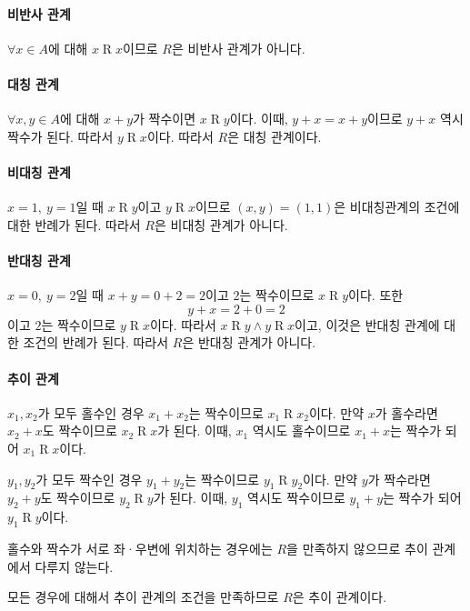 \documentclass{oblivoir}
\begin{document}
\paragraph{비반사 관계}
$\forall x \in A$에 대해 $x \mathrel R x$이므로
$R$은 비반사 관계가 아니다.

\paragraph{대칭 관계}
$\forall x,y \in A$에 대해 $x + y$가 짝수이면 $x \mathrel R y$이다.
이때, $y + x = x + y$이므로 $y + x$ 역시 짝수가 된다.
따라서 $y \mathrel R x$이다.
따라서 $R$은 대칭 관계이다.

\paragraph{비대칭 관계}
$x = 1,\ y = 1$일 때 $x \mathrel R y$이고 $y \mathrel R x$이므로
$(x,y) = (1,1)$은 비대칭관계의 조건에 대한 반례가 된다.
따라서 $R$은 비대칭 관계가 아니다.

\paragraph{반대칭 관계}
$x = 0,\ y = 2$일 때 $x + y = 0 + 2 = 2$이고 $2$는 짝수이므로 $x \mathrel R y$이다.
또한
\begin{equation}
    y + x = 2 + 0 = 2
\end{equation}이고 $2$는 짝수이므로 $y \mathrel R x$이다.
따라서 $x \mathrel R y \wedge y \mathrel R x$이고,
이것은 반대칭 관계에 대한 조건의 반례가 된다.
따라서 $R$은 반대칭 관계가 아니다.

\paragraph{추이 관계}
$x_1,x_2$가 모두 홀수인 경우 $x_1 + x_2$는 짝수이므로 $x_1 \mathrel R x_2$이다.
만약 $x$가 홀수라면 $x_2 + x$도 짝수이므로 $x_2 \mathrel R x$가 된다.
이때, $x_1$ 역시도 홀수이므로 $x_1 + x$는 짝수가 되어 $x_1 \mathrel R x$이다.

$y_1,y_2$가 모두 짝수인 경우 $y_1 + y_2$는 짝수이므로 $y_1 \mathrel R y_2$이다.
만약 $y$가 짝수라면 $y_2 + y$도 짝수이므로 $y_2 \mathrel R y$가 된다.
이때, $y_1$ 역시도 짝수이므로 $y_1 + y$는 짝수가 되어 $y_1 \mathrel R y$이다.

홀수와 짝수가 서로 좌·우변에 위치하는 경우에는
$R$을 만족하지 않으므로 추이 관계에서 다루지 않는다.

모든 경우에 대해서 추이 관계의 조건을 만족하므로 $R$은 추이 관계이다.
\end{document}
